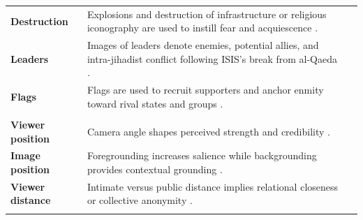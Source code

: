 \begin{longtable}{L{2.0cm} L{4.0cm} C{4.0cm}}
\textbf{Destruction} &
Explosions and destruction of infrastructure or religious iconography are used to instill fear and acquiescence \parencite{winkler2018a,winkler2019e}. &
\hfill
{}\\
\addlinespace

\textbf{Leaders} &
Images of leaders denote enemies, potential allies, and intra-jihadist conflict following ISIS’s break from al-Qaeda \parencite{winkler2022d}. &
\hfill
{}\\
\addlinespace

\textbf{Flags} &
Flags are used to recruit supporters and anchor enmity toward rival states and groups \parencite{el2021a,warrick2016a}. &
\hfill
{}\\
\addlinespace

\\
\addlinespace

\textbf{Viewer position} &
Camera angle shapes perceived strength and credibility \parencite{kraft1986a,mccain1977a}. &
\hfill
{}\\
\addlinespace

\textbf{Image position} &
Foregrounding increases salience while backgrounding provides contextual grounding \parencite{stone2003b}. &
\hfill
{}\\
\addlinespace

\textbf{Viewer distance} &
Intimate versus public distance implies relational closeness or collective anonymity \parencite{jewitt2008a}. &
\hfill
{}\\
\addlinespace


\end{longtable}
